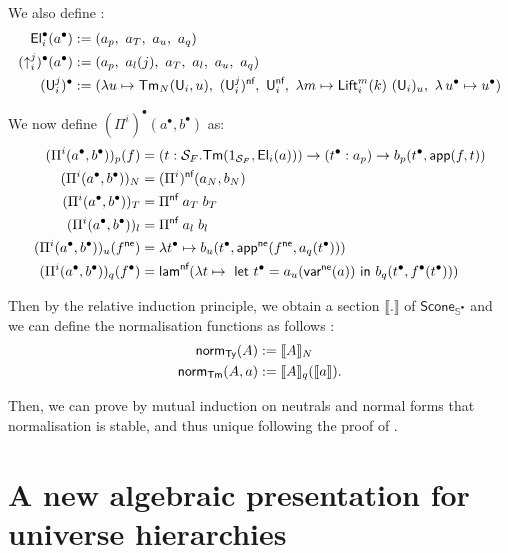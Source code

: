 \documentclass{article}
\begin{document}
            We also define :
            \begin{align*}
                \El_i^\bullet(a^\bullet) &:= (a_p,\ a_T,\ a_u,\ a_q)\\
                (\uparrow_i^j)^\bullet(a^\bullet) &:= (a_p,\ a_l(j),\ a_T,\ a_l,\ a_u,\ a_q)\\
                (\U_i^j)^\bullet &:= (\lambda u \mapsto \Tm_N(\U_i,u),\ (\U_i^j)^\nf,\ \U_i^\nf,\ \lambda m \mapsto \mathsf{Lift}_i^m(k)  \ (\U_i)_u,\ \lambda \,u^\bullet  \mapsto u^\bullet )
            \end{align*}

        We now define $(\Pi^i)^\bullet(a^\bullet,b^\bullet)$ as:
            \begin{align*}
                (\Pi^i(a^\bullet,b^\bullet))_p(f) &= (t: \mathcal{S}_F.\textsf{Tm}(1_{\mathcal{S}_F},\textsf{El}_i(a))) \rightarrow (t^\bullet : a_p)  \rightarrow b_p (t^\bullet,\textsf{app}(f,t))\\
                (\Pi^i(a^\bullet,b^\bullet))_N &= (\Pi^i)^{\textsf{nf}} (a_N, b_N)\\
                (\Pi^i(a^\bullet,b^\bullet))_T &= \Pi^{\textsf{nf}} \; a_T \; b_T\\
                (\Pi^i(a^\bullet,b^\bullet))_l &= \Pi^{\textsf{nf}} \; a_l \; b_l\\
                (\Pi^i(a^\bullet,b^\bullet))_u (f^{\textsf{ne}}) &= \lambda t^\bullet \mapsto b_u(t^\bullet, \textsf{app}^{\textsf{ne}}(f^{\textsf{ne}},a_q(t^\bullet)))\\
                (\Pi^i(a^\bullet,b^\bullet))_q (f^\bullet) &= \textsf{lam}^{\textsf{nf}}(\lambda t \mapsto \textsf{ let } t^\bullet = a_u(\textsf{var}^{\textsf{ne}}(a)) \textsf{ in } b_q(t^\bullet,f^\bullet(t^\bullet)))
            \end{align*}

            Then by the relative induction principle, we obtain a section $\llbracket . \rrbracket$ of $\mathsf{Scone}_{\mathbb{S}^\bullet}$ and we can define the normalisation functions as follows :
            \begin{align*}
                \mathsf{norm}_{\textsf{Ty}}(A) &:=  \llbracket A \rrbracket_N\\
                \mathsf{norm}_{\textsf{Tm}}(A,a) &:=  \llbracket A \rrbracket_q(\llbracket a \rrbracket).
            \end{align*}

            Then, we can prove by mutual induction on neutrals and normal forms that normalisation is stable, and thus unique following the proof of \cite{sconing}.


\section{A new algebraic presentation for universe hierarchies}
\end{document}
